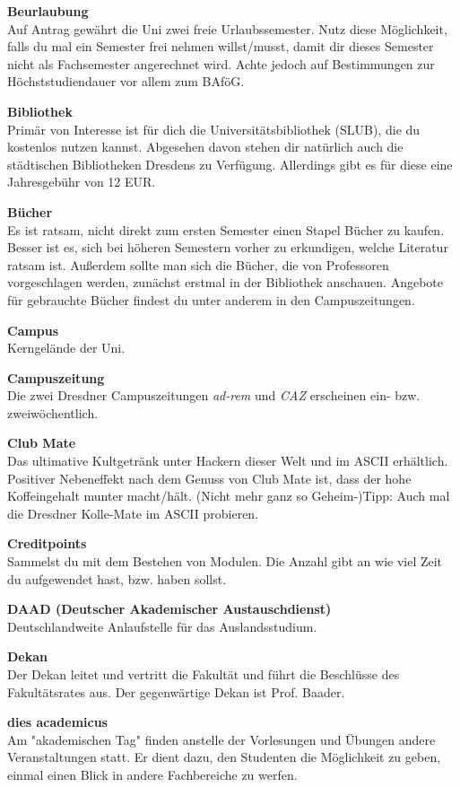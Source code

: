 \textbf{Beurlaubung} \\
Auf Antrag gewährt die Uni zwei freie Urlaubssemester.
Nutz diese Möglichkeit, falls du mal ein Semester frei nehmen willst/musst, damit dir dieses Semester nicht als Fachsemester angerechnet wird.
Achte jedoch auf Bestimmungen zur Höchststudiendauer vor allem zum BAföG.

\textbf{Bibliothek} \\
Primär von Interesse ist für dich die Universitätsbibliothek (SLUB), die du kostenlos nutzen kannst.
Abgesehen davon stehen dir natürlich auch die städtischen Bibliotheken Dresdens zu Verfügung.
Allerdings gibt es für diese eine Jahresgebühr von 12 EUR.

\textbf{Bücher} \\
Es ist ratsam, nicht direkt zum ersten Semester einen Stapel Bücher zu kaufen.
Besser ist es, sich bei höheren Semestern vorher zu erkundigen, welche Literatur ratsam ist.
Außerdem sollte man sich die Bücher, die von Professoren vorgeschlagen werden, zunächst erstmal in der Bibliothek anschauen.
Angebote für gebrauchte Bücher findest du unter anderem in den Campuszeitungen.

\textbf{Campus} \\
Kerngelände der Uni.

\textbf{Campuszeitung} \\
Die zwei Dresdner Campuszeitungen \textit{ad-rem} und \textit{CAZ} erscheinen ein- bzw. zweiwöchentlich.

\textbf{Club Mate} \\
Das ultimative Kultgetränk unter Hackern dieser Welt und im ASCII erhältlich.
Positiver Nebeneffekt nach dem Genuss von Club Mate ist, dass der hohe Koffeingehalt munter macht/hält.
(Nicht mehr ganz so Geheim-)Tipp:
Auch mal die Dresdner Kolle-Mate im ASCII probieren.

\textbf{Creditpoints} \\
Sammelst du mit dem Bestehen von Modulen.
Die Anzahl gibt an wie viel Zeit du aufgewendet hast, bzw. haben sollst.

\textbf{DAAD (Deutscher Akademischer Austauschdienst)} \\
Deutschlandweite Anlaufstelle für das Auslandsstudium.

\textbf{Dekan} \\
Der Dekan leitet und vertritt die Fakultät und führt die Beschlüsse des Fakultätsrates aus.
Der gegenwärtige Dekan ist Prof. Baader.

\textbf{dies academicus} \\
Am "akademischen Tag" finden anstelle der Vorlesungen und Übungen andere Veranstaltungen statt.
Er dient dazu, den Studenten die Möglichkeit zu geben, einmal einen Blick in andere Fachbereiche zu werfen.

